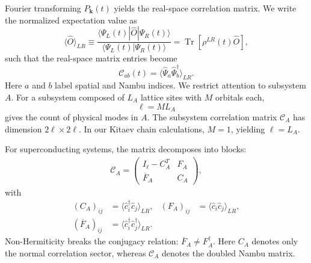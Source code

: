 \documentclass[aps,prb,reprint,superscriptaddress,amsmath,amssymb,floatfix]{revtex4-2}
\begin{document}
  Fourier transforming $P_{\bm k}(t)$ yields the real-space correlation matrix. We write the normalized expectation value as
\begin{equation}
\langle \hat O\rangle_{LR} \equiv \frac{ \langle\Psi_L(t)|\hat O|\Psi_R(t)\rangle }{ \langle\Psi_L(t)|\Psi_R(t)\rangle } = \operatorname{Tr}\!\left[\rho^{LR}(t)\hat O\right],
\label{eq:LR_expectation}
\end{equation}
such that the real-space matrix entries become
\begin{equation}
\mathcal C_{ab}(t) = \langle \hat\Psi_a\hat\Psi_b^\dagger \rangle_{LR}.
\label{eq:general_corr}
\end{equation}
Here $a$ and $b$ label spatial and Nambu indices. We restrict attention to subsystem $A$. For a subsystem composed of $L_A$ lattice sites with $M$ orbitals each,
\begin{equation}
\ell=M L_A
\label{eq:subsystem_modes}
\end{equation}
gives the count of physical modes in $A$. The subsystem correlation matrix $\mathcal C_A$ has dimension $2\ell\times2\ell$. In our Kitaev chain calculations, $M=1$, yielding $\ell=L_A$.

  For superconducting systems, the matrix decomposes into blocks:
\begin{equation}
\begin{aligned}
\mathcal C_A = \begin{pmatrix} I_\ell-C_A^T & F_A\\ \overline F_A & C_A \end{pmatrix},
\end{aligned} \label{eq:general_CA}
\end{equation}
with
\begin{equation}
\begin{aligned}
(C_A)_{ij} &= \langle \hat c_i^\dagger \hat c_j\rangle_{LR}, & (F_A)_{ij} &= \langle \hat c_i \hat c_j\rangle_{LR}, \\ (\overline F_A)_{ij} &= \langle \hat c_i^\dagger \hat c_j^\dagger\rangle_{LR}.
\end{aligned} \label{eq:general_normal_anomalous}
\end{equation}
Non-Hermiticity breaks the conjugacy relation: $\overline F_A\neq F_A^\dagger$. Here $C_A$ denotes only the normal correlation sector, whereas $\mathcal C_A$ denotes the doubled Nambu matrix.
\end{document}

